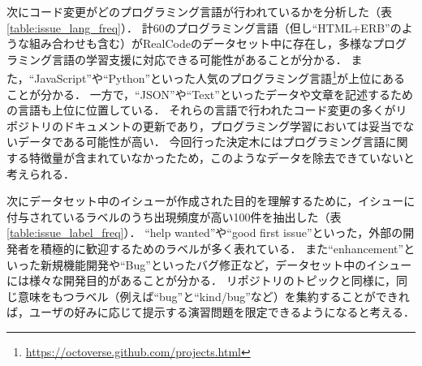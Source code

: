 次にコード変更がどのプログラミング言語が行われているかを分析した（表\ref{table:issue_lang_freq}）．
計60のプログラミング言語（但し``HTML+ERB''のような組み合わせも含む）がRealCodeのデータセット中に存在し，多様なプログラミング言語の学習支援に対応できる可能性があることが分かる．
また，``JavaScript''や``Python''といった人気のプログラミング言語\footnote{\url{https://octoverse.github.com/projects.html}}が上位にあることが分かる．
一方で，``JSON''や``Text''といったデータや文章を記述するための言語も上位に位置している．
それらの言語で行われたコード変更の多くがリポジトリのドキュメントの更新であり，プログラミング学習においては妥当でないデータである可能性が高い．
今回行った決定木にはプログラミング言語に関する特徴量が含まれていなかったため，このようなデータを除去できていないと考えられる．

次にデータセット中のイシューが作成された目的を理解するために，イシューに付与されているラベルのうち出現頻度が高い100件を抽出した（表\ref{table:issue_label_freq}）．
``help wanted''や``good first issue''といった，外部の開発者を積極的に歓迎するためのラベルが多く表れている．
また``enhancement''といった新規機能開発や``Bug''といったバグ修正など，データセット中のイシューには様々な開発目的があることが分かる．
リポジトリのトピックと同様に，同じ意味をもつラベル（例えば``bug''と``kind/bug''など）を集約することができれば，ユーザの好みに応じて提示する演習問題を限定できるようになると考える．



